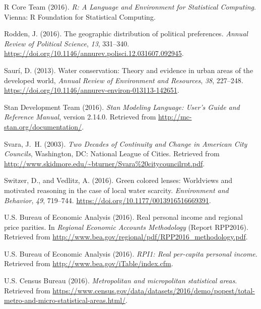 \documentclass[draft,linenumbers]{agujournal}
\begin{document}
\begin{thebibliography}{33}
  {R Core Team} (2016). \textit{R: A Language and Environment for Statistical
  Computing}.
  Vienna: R Foundation for Statistical Computing.

  Rodden, J. (2016).
  The geographic distribution of political preferences.
  \textit{Annual Review of Political Science}, \textit{13}, 331--340.
  \url{https://doi.org/10.1146/annurev.polisci.12.031607.092945}.

  Saur\'i, D. (2013).
  Water conservation: {T}heory and evidence in urban areas of the developed world,
  \textit{Annual Review of Environment and Resources}, \textit{38}, 227--248.
  \url{https://doi.org/10.1146/annurev-environ-013113-142651}.

  {Stan Development Team} (2016).
  \textit{{S}tan Modeling Language: User's Guide and Reference Manual}, version 2.14.0.
  Retrieved from
  \url{http://mc-stan.org/documentation/}.

  Svara, J.~H. (2003).
  \textit{Two Decades of Continuity and Change in American City Councils},
  Washington, DC: National League of Cities.
  Retrieved from
  \url{http://www.skidmore.edu/~bturner/Svara%20citycouncilrpt.pdf}.

  Switzer, D., and Vedlitz, A. (2016).
  Green colored lenses: Worldviews and motivated reasoning in the case of local
  water scarcity.
  \textit{Environment and Behavior}, \textit{49}, 719--744.
  \url{https://doi.org/10.1177/0013916516669391}.

  U.S. Bureau of Economic Analysis (2016{}).
  Real personal income and regional price parities.
  In \textit{Regional Economic Accounts Methodology\/}
  (Report  RPP2016).
  Retrieved from
  \url{http://www.bea.gov/regional/pdf/RPP2016_methodology.pdf}.

  U.S. Bureau of Economic Analysis (2016{}).
  \textit{{RPI1}: Real per-capita personal income}.
  Retrieved from
  \url{http://www.bea.gov/iTable/index.cfm}.

  U.S. Census Bureau (2016).
  \textit{Metropolitan and micropolitan statistical areas}.
  Retrieved from
  \url{https://www.census.gov/data/datasets/2016/demo/popest/total-metro-and-micro-statistical-areas.html/}.


\end{thebibliography}
\end{document}
